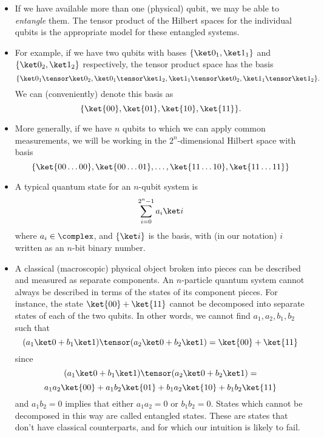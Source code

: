 \documentclass{slides}
\begin{document}
\begin{slide}{}

\begin{itemize}
	\item If we have available more than one (physical) qubit, we may be able to {\em entangle} them.  The tensor product of the Hilbert spaces for the individual qubits is the appropriate model for these entangled systems.

	\item For example, if we have two qubits with bases $\{\ket 0_1,\ket 1_1\}$ and
	$\{ \ket 0_2,\ket 1_2\}$ respectively, the tensor product space has the basis 
	$$\{\ket 0_1\tensor\ket 0_2,\ket 0_1\tensor\ket 1_2,\ket 1_1\tensor\ket 0_2,\ket 1_1\tensor\ket 1_2\}.$$  We can (conveniently) denote this basis as
$$\{\ket{00},\ket{01},\ket{10},\ket{11}\}.$$
\end{itemize}

\end{slide}

\begin{slide}{}

\begin{itemize}

	\item More generally, if we have $n$ qubits to which we can apply common measurements, we will be working in the $2^n$-dimensional Hilbert space with basis
$$\{\ket{00\ldots00},\ket{00\ldots01},\ldots,\ket{11\ldots10},\ket{11\ldots11}\}$$
\item A typical quantum state for an $n$-qubit system is
$$\sum_{i = 0}^{2^n-1}a_i\ket i$$
where $a_i\in\complex$, and $\{\ket i\}$ is the basis, with (in our notation) $i$ written as an $n$-bit binary number.

\end{itemize}

\end{slide}

\begin{slide}{}

\begin{itemize}
\item A classical (macroscopic) physical 
object broken into pieces can be described and measured as separate components.
An $n$-particle quantum system cannot always be
described in terms of the states of its component pieces. For instance, 
the state \newline$\ket{00}+\ket{11}$ cannot be decomposed into separate states
of each of the two qubits.  In other words, we cannot find 
$a_1,a_2,b_1,b_2$ such that 
$$(a_1\ket 0 + b_1\ket 1)\tensor (a_2\ket 0 + b_2\ket 1) = \ket{00}+\ket{11}$$
since 
$$(a_1\ket 0 + b_1\ket 1)\tensor (a_2\ket 0 + b_2\ket 1) = $$
$$  a_1a_2\ket{00} + a_1b_2\ket{01} + b_1a_2\ket{10} + b_1b_2\ket{11}$$ and
$a_1b_2 = 0$ implies that either $a_1a_2 = 0$ or $b_1b_2 = 0$.
States which cannot be decomposed in this way are called entangled states.
These are states that don't have classical counterparts, and
for which our intuition is likely to fail.

\end{itemize}

\end{slide}
\end{document}
